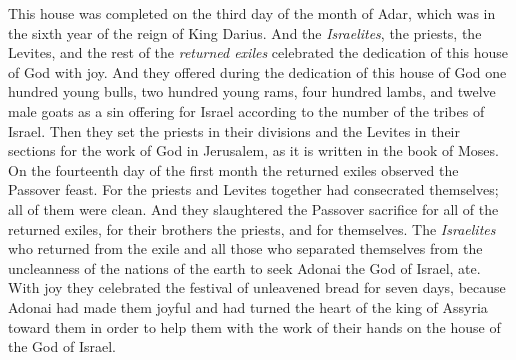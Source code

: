 \begin{biblechapter}
\verse This house was completed on the third day of the month of Adar, which was in the sixth year of the reign of King Darius.
\verse And the \textit{Israelites}, the priests, the Levites, and the rest of the \textit{returned exiles} celebrated the dedication of this house of God with joy.
\verse And they offered during the dedication of this house of God one hundred young bulls, two hundred young rams, four hundred lambs, and twelve male goats as a sin offering for Israel according to the number of the tribes of Israel.
\verse Then they set the priests in their divisions and the Levites in their sections for the work of God in Jerusalem, as it is written in the book of Moses.
 On the fourteenth day of the first month the returned exiles observed the Passover feast.
\verse For the priests and Levites together had consecrated themselves; all of them were clean. And they slaughtered the Passover sacrifice for all of the returned exiles, for their brothers the priests, and for themselves.
\verse The \textit{Israelites} who returned from the exile and all those who separated themselves from the uncleanness of the nations of the earth to seek Adonai the God of Israel, ate.
\verse With joy they celebrated the festival of unleavened bread for seven days, because Adonai had made them joyful and had turned the heart of the king of Assyria toward them in order to help them with the work of their hands on the house of the God of Israel.
\end{biblechapter}

